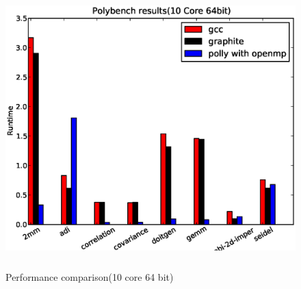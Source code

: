 \begin{figure}
\begin{center}
  \label{fig:10core}
  \includegraphics[height=10cm]{images/10core64bit.eps}
  \caption{Performance comparison(10 core 64 bit)}
\end{center}
\end{figure}
